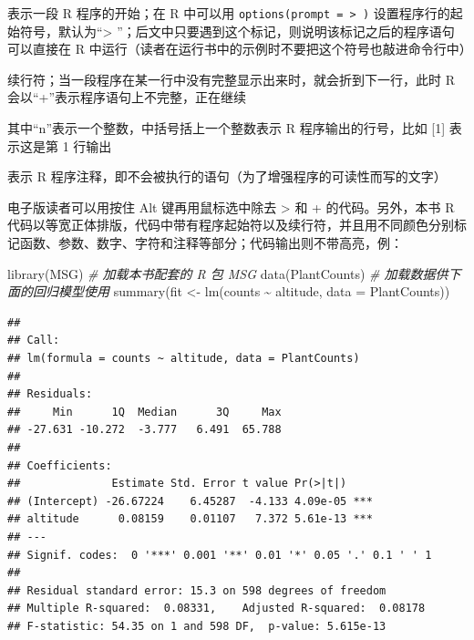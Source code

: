 \documentclass[
  b5paper,
  UTF8,twoside]{book}
\newenvironment{Shaded}{\begin{snugshade}}{\end{snugshade}}
\newcommand{\AttributeTok}[1]{\textcolor[rgb]{0.77,0.63,0.00}{#1}}
\newcommand{\CommentTok}[1]{\textcolor[rgb]{0.56,0.35,0.01}{\textit{#1}}}
\newcommand{\FunctionTok}[1]{\textcolor[rgb]{0.00,0.00,0.00}{#1}}
\newcommand{\NormalTok}[1]{#1}
\newcommand{\OtherTok}[1]{\textcolor[rgb]{0.56,0.35,0.01}{#1}}
\newcommand{\SpecialCharTok}[1]{\textcolor[rgb]{0.00,0.00,0.00}{#1}}
\providecommand{\tightlist}{%
  \setlength{\itemsep}{0pt}\setlength{\parskip}{0pt}}
\begin{document}
\begin{description}
\tightlist
\item[\texttt{\textgreater{}}]
表示一段 R 程序的开始；在 R 中可以用 \texttt{options(prompt\ =\ \textquotesingle{}\textgreater{}\ \textquotesingle{})} 设置程序行的起始符号，默认为``\textgreater{} ''；后文中只要遇到这个标记，则说明该标记之后的程序语句可以直接在 R 中运行（读者在运行书中的示例时不要把这个符号也敲进命令行中）
\item[\texttt{+}]
续行符；当一段程序在某一行中没有完整显示出来时，就会折到下一行，此时 R 会以``+''表示程序语句上不完整，正在继续
\item[\texttt{{[}n{]}}]
其中``n''表示一个整数，中括号括上一个整数表示 R 程序输出的行号，比如 {[}1{]} 表示这是第 1 行输出
\item[\texttt{\#}]
表示 R 程序注释，即不会被执行的语句（为了增强程序的可读性而写的文字）
\end{description}

电子版读者可以用按住 Alt 键再用鼠标选中除去 \textgreater{} 和 + 的代码。另外，本书 R 代码以等宽正体排版，代码中带有程序起始符以及续行符，并且用不同颜色分别标记函数、参数、数字、字符和注释等部分；代码输出则不带高亮，例：

\begin{Shaded}
\begin{Highlighting}[]
\FunctionTok{library}\NormalTok{(MSG) }\CommentTok{\# 加载本书配套的 R 包 MSG}
\FunctionTok{data}\NormalTok{(PlantCounts) }\CommentTok{\# 加载数据供下面的回归模型使用}
\FunctionTok{summary}\NormalTok{(fit }\OtherTok{\textless{}{-}} \FunctionTok{lm}\NormalTok{(counts }\SpecialCharTok{\textasciitilde{}}\NormalTok{ altitude, }\AttributeTok{data =}\NormalTok{ PlantCounts))}
\end{Highlighting}
\end{Shaded}

\begin{verbatim}
## 
## Call:
## lm(formula = counts ~ altitude, data = PlantCounts)
## 
## Residuals:
##     Min      1Q  Median      3Q     Max 
## -27.631 -10.272  -3.777   6.491  65.788 
## 
## Coefficients:
##              Estimate Std. Error t value Pr(>|t|)    
## (Intercept) -26.67224    6.45287  -4.133 4.09e-05 ***
## altitude      0.08159    0.01107   7.372 5.61e-13 ***
## ---
## Signif. codes:  0 '***' 0.001 '**' 0.01 '*' 0.05 '.' 0.1 ' ' 1
## 
## Residual standard error: 15.3 on 598 degrees of freedom
## Multiple R-squared:  0.08331,    Adjusted R-squared:  0.08178 
## F-statistic: 54.35 on 1 and 598 DF,  p-value: 5.615e-13
\end{verbatim}
\end{document}
